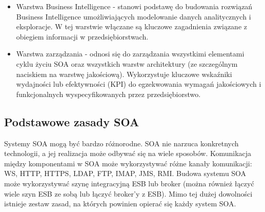 \begin{itemize}
\item{Warstwa Business Intelligence - stanowi podstawę do budowania rozwiązań Business Intelligence umożliwiających modelowanie danych analitycznych i eksploracje. W tej warstwie włączane są kluczowe zagadnienia związane z obiegiem informacji w przedsiębiorstwach.}
\item{Warstwa zarządzania - odnosi się do zarządzania wszystkimi elementami cyklu życiu SOA oraz wszystkich warstw architektury (ze szczególnym naciskiem na warstwę jakościową). Wykorzystuje kluczowe wskaźniki wydajności lub efektywności (KPI) do egzekwowania wymagań jakościowych i funkcjonalnych wyspecyfikowanych przez przedsiębiorstwo. \cite{PlatIntGor}}
\end{itemize}

\subsection{Podstawowe zasady SOA}
Systemy SOA mogą być bardzo różnorodne. SOA nie narzuca konkretnych technologii, a jej realizacja może odbywać się na wiele sposobów. Komunikacja między komponentami w SOA może wykorzystywać różne kanały komunikacji: WS, HTTP, HTTPS, LDAP, FTP, IMAP, JMS, RMI. Budowa systemu SOA może wykorzystywać szynę integracyjną ESB lub broker (można również łączyć wiele szyn ESB ze sobą lub łączyć broker’y z ESB). Mimo tej dużej dowolności istnieje zestaw zasad, na których powinien opierać się każdy system SOA.
